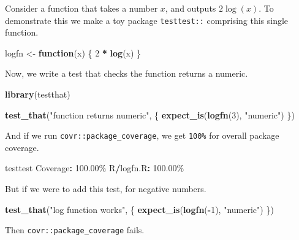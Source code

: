 \documentclass[
]{article}
\newenvironment{Shaded}{\begin{snugshade}}{\end{snugshade}}
\newcommand{\ControlFlowTok}[1]{\textcolor[rgb]{0.13,0.29,0.53}{\textbf{#1}}}
\newcommand{\DecValTok}[1]{\textcolor[rgb]{0.00,0.00,0.81}{#1}}
\newcommand{\FloatTok}[1]{\textcolor[rgb]{0.00,0.00,0.81}{#1}}
\newcommand{\KeywordTok}[1]{\textcolor[rgb]{0.13,0.29,0.53}{\textbf{#1}}}
\newcommand{\NormalTok}[1]{#1}
\newcommand{\OperatorTok}[1]{\textcolor[rgb]{0.81,0.36,0.00}{\textbf{#1}}}
\newcommand{\StringTok}[1]{\textcolor[rgb]{0.31,0.60,0.02}{#1}}
\begin{document}
Consider a function that takes a number \(x\), and outputs \(2\log(x)\).
To demonstrate this we make a toy package \texttt{testtest::} comprising
this single function.

\begin{Shaded}
\begin{Highlighting}[]
\NormalTok{logfn <{-}}\StringTok{ }\ControlFlowTok{function}\NormalTok{(x) \{}
  \DecValTok{2} \OperatorTok{*}\StringTok{ }\KeywordTok{log}\NormalTok{(x)}
\NormalTok{\}}
\end{Highlighting}
\end{Shaded}

Now, we write a test that checks the function returns a numeric.

\begin{Shaded}
\begin{Highlighting}[]
\KeywordTok{library}\NormalTok{(testthat)}

\KeywordTok{test\_that}\NormalTok{(}\StringTok{"function returns numeric"}\NormalTok{, \{}
  \KeywordTok{expect\_is}\NormalTok{(}\KeywordTok{logfn}\NormalTok{(}\DecValTok{3}\NormalTok{), }\StringTok{"numeric"}\NormalTok{)}
\NormalTok{\})}
\end{Highlighting}
\end{Shaded}

And if we run \texttt{covr::package\_coverage}, we get \texttt{100\%}
for overall package coverage.

\begin{Shaded}
\begin{Highlighting}[]
\NormalTok{testtest Coverage}\OperatorTok{:}\StringTok{ }\FloatTok{100.00}\NormalTok{\%}
\NormalTok{R}\OperatorTok{/}\NormalTok{logfn.R}\OperatorTok{:}\StringTok{ }\FloatTok{100.00}\NormalTok{\%}
\end{Highlighting}
\end{Shaded}

But if we were to add this test, for negative numbers.

\begin{Shaded}
\begin{Highlighting}[]
\KeywordTok{test\_that}\NormalTok{(}\StringTok{"log function works"}\NormalTok{, \{}
  \KeywordTok{expect\_is}\NormalTok{(}\KeywordTok{logfn}\NormalTok{(}\OperatorTok{{-}}\DecValTok{1}\NormalTok{), }\StringTok{"numeric"}\NormalTok{)}
\NormalTok{\})}
\end{Highlighting}
\end{Shaded}

Then \texttt{covr::package\_coverage} fails.
\end{document}
